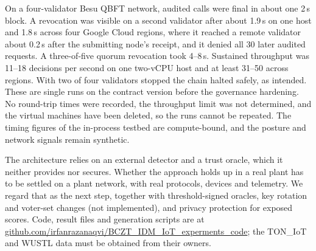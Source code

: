On a four-validator Besu QBFT network, audited calls were final in about one 2\,s block. A revocation was visible on a second validator after about 1.9\,s on one host and 1.8\,s across four Google Cloud regions, where it reached a remote validator about 0.2\,s after the submitting node's receipt, and it denied all 30 later audited requests. A three-of-five quorum revocation took 4--8\,s. Sustained throughput was 11--18 decisions per second on one two-vCPU host and at least 31--50 across regions. With two of four validators stopped the chain halted safely, as intended. These are single runs on the contract version before the governance hardening. No round-trip times were recorded, the throughput limit was not determined, and the virtual machines have been deleted, so the runs cannot be repeated. The timing figures of the in-process testbed are compute-bound, and the posture and network signals remain synthetic.

The architecture relies on an external detector and a trust oracle, which it neither provides nor secures. Whether the approach holds up in a real plant has to be settled on a plant network, with real protocols, devices and telemetry. We regard that as the next step, together with threshold-signed oracles, key rotation and voter-set changes (not implemented), and privacy protection for exposed scores. Code, result files and generation scripts are at \href{https://github.com/irfanrazanaqvi/BCZT_IDM_IoT_experments_code}{github.com/irfanrazanaqvi/BCZT\_IDM\_IoT\_experments\_code}; the TON\_IoT and WUSTL data must be obtained from their owners.


